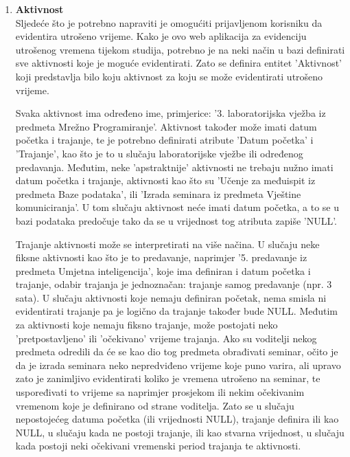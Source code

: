 \documentclass[times, utf8, zavrsni, numeric]{fer}
\begin{document}
\begin{enumerate}[leftmargin=*]
\item \textbf{Aktivnost}\\
Sljedeće što je potrebno napraviti je omogućiti prijavljenom korisniku da evidentira utrošeno vrijeme. Kako je ovo web aplikacija za evidenciju utrošenog vremena tijekom studija, potrebno je na neki način u bazi definirati sve aktivnosti koje je moguće evidentirati. Zato se definira entitet 'Aktivnost' koji predstavlja bilo koju aktivnost za koju se može evidentirati utrošeno vrijeme.

Svaka aktivnost ima određeno ime, primjerice: '3. laboratorijska vježba iz predmeta Mrežno Programiranje'. Aktivnost također može imati datum početka i trajanje, te je potrebno definirati atribute 'Datum početka' i 'Trajanje', kao što je to u slučaju laboratorijske vježbe ili određenog predavanja. Međutim, neke 'apstraktnije' aktivnosti ne trebaju nužno imati datum početka i trajanje, aktivnosti kao što su 'Učenje za međuispit iz predmeta Baze podataka', ili 'Izrada seminara iz predmeta Vještine komuniciranja'. U tom slučaju aktivnost neće imati datum početka, a to se u bazi podataka predočuje tako da se u vrijednost tog atributa zapiše 'NULL'.

Trajanje aktivnosti može se interpretirati na više načina. U slučaju neke fiksne aktivnosti kao što je to predavanje, naprimjer '5. predavanje iz predmeta Umjetna inteligencija', koje ima definiran i datum početka i trajanje, odabir trajanja je jednoznačan: trajanje samog predavanje (npr. 3 sata). U slučaju aktivnosti koje nemaju definiran početak, nema smisla ni evidentirati trajanje pa je logično da trajanje također bude NULL. Međutim za aktivnosti koje nemaju fiksno trajanje, može postojati neko 'pretpostavljeno' ili 'očekivano' vrijeme trajanja. Ako su voditelji nekog predmeta odredili da će se kao dio tog predmeta obrađivati seminar, očito je da je izrada seminara neko nepredviđeno vrijeme koje puno varira, ali upravo zato je zanimljivo evidentirati koliko je vremena utrošeno na seminar, te uspoređivati to vrijeme sa naprimjer prosjekom ili nekim očekivanim vremenom koje je definirano od strane voditelja. Zato se u slučaju nepostojećeg datuma početka (ili vrijednosti NULL), trajanje definira ili kao NULL, u slučaju kada ne postoji trajanje, ili kao stvarna vrijednost, u slučaju kada postoji neki očekivani vremenski period trajanja te aktivnosti.


\end{enumerate}
\end{document}
